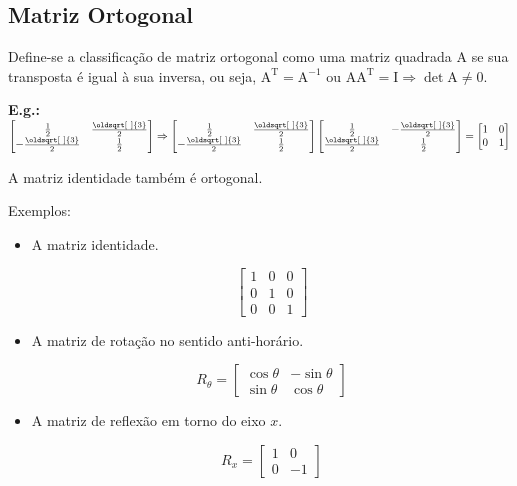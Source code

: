 \documentclass[a4paper,12pt]{article}
\renewcommand*{\sqrt}[2][\ ]{\oldsqrt[#1]{#2}}
\begin{document}
\subsection{Matriz Ortogonal}

Define-se a classificação de matriz ortogonal como uma matriz quadrada $ \text{A} $ se sua transposta é igual à sua inversa, ou seja, $ \text{A}^{\text{T}} = \text{A}^{-1} $ ou $ \text{A}\text{A}^{\text{T}} = \text{I} \Rightarrow \det \text{A} \neq 0$.

\textbf{E.g.:} $ \begin{bmatrix}
\frac{1}{2} & \frac{\sqrt{3}}{2} \\
- \frac{\sqrt{3}}{2} & \frac{1}{2}
\end{bmatrix} \Rightarrow  \begin{bmatrix}
\frac{1}{2} & \frac{\sqrt{3}}{2} \\
- \frac{\sqrt{3}}{2} & \frac{1}{2}
\end{bmatrix}  \begin{bmatrix}
\frac{1}{2} & - \frac{\sqrt{3}}{2} \\
 \frac{\sqrt{3}}{2} & \frac{1}{2}
\end{bmatrix} = \begin{bmatrix}
1 & 0 \\
0 & 1
\end{bmatrix} $

A matriz identidade também é ortogonal.

Exemplos:

\begin{itemize}

    \item A matriz identidade.
    
    $$ \begin{bmatrix}
    1 & 0 & 0\\
    0 & 1 & 0\\
    0 & 0 & 1
    \end{bmatrix} $$
    
    \item A matriz de rotação no sentido anti-horário.
    
    $$ R_{\theta} = \begin{bmatrix}
    \cos \theta & - \sin \theta \\
    \sin \theta & \cos \theta
    \end{bmatrix} $$
    
    \item A matriz de reflexão em torno do eixo $ x $.
    
    $$ R_{x} = \begin{bmatrix}
    1 & 0\\
    0 & -1
    \end{bmatrix} $$
    
\end{itemize}
\end{document}
